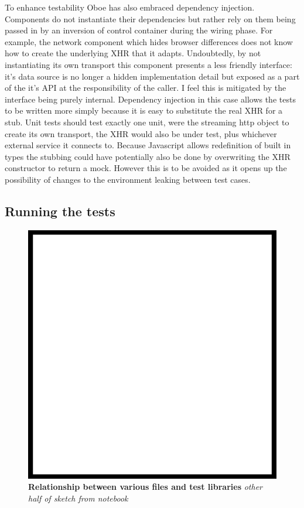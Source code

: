 \documentclass[]{article}
\makeatletter
\def\maxwidth{\ifdim\Gin@nat@width>\linewidth\linewidth
\else\Gin@nat@width\fi}
\let\Oldincludegraphics\includegraphics
\renewcommand{\includegraphics}[1]{\Oldincludegraphics[width=\maxwidth]{#1}}
\makeatother
\begin{document}
To enhance testability Oboe has also embraced dependency injection.
Components do not instantiate their dependencies but rather rely on them
being passed in by an inversion of control container during the wiring
phase. For example, the network component which hides browser
differences does not know how to create the underlying XHR that it
adapts. Undoubtedly, by not instantiating its own transport this
component presents a less friendly interface: it's data source is no
longer a hidden implementation detail but exposed as a part of the it's
API at the responsibility of the caller. I feel this is mitigated by the
interface being purely internal. Dependency injection in this case
allows the tests to be written more simply because it is easy to
substitute the real XHR for a stub. Unit tests should test exactly one
unit, were the streaming http object to create its own transport, the
XHR would also be under test, plus whichever external service it
connects to. Because Javascript allows redefinition of built in types
the stubbing could have potentially also be done by overwriting the XHR
constructor to return a mock. However this is to be avoided as it opens
up the possibility of changes to the environment leaking between test
cases.

\subsection{Running the tests}

\begin{figure}[htbp]
\centering
\includegraphics{images/placeholder.png}
\caption{\textbf{Relationship between various files and test libraries}
\emph{other half of sketch from notebook}}
\end{figure}
\end{document}
